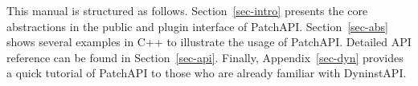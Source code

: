 This manual is structured as follows. Section~\ref{sec-intro} presents the core
abstractions in the public and plugin interface of
PatchAPI. Section~\ref{sec-abs} shows several examples in C++ to illustrate the
usage of PatchAPI. Detailed API reference can be found in
Section~\ref{sec-api}. Finally, Appendix~\ref{sec-dyn} provides a quick tutorial
of PatchAPI to those who are already familiar with DyninstAPI.
